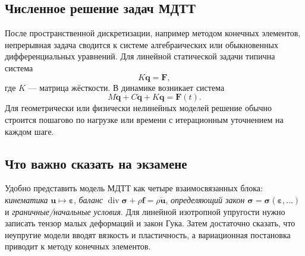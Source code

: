 \subsection{Численное решение задач МДТТ}

После пространственной дискретизации, например методом конечных элементов,
непрерывная задача сводится к системе алгебраических или обыкновенных
дифференциальных уравнений. Для линейной статической задачи типична система
\[
    K\mathbf q=\mathbf F,
\]
где $K$ --- матрица жёсткости. В динамике возникает система
\[
    M\ddot{\mathbf q}+C\dot{\mathbf q}+K\mathbf q=\mathbf F(t).
\]
Для геометрически или физически нелинейных моделей решение обычно строится
пошагово по нагрузке или времени с итерационным уточнением на каждом шаге.

\subsection{Что важно сказать на экзамене}

Удобно представить модель МДТТ как четыре взаимосвязанных блока:
\emph{кинематика} $\mathbf u\mapsto\boldsymbol\varepsilon$,
\emph{баланс} $\operatorname{div}\boldsymbol\sigma+\rho\mathbf f
=\rho\ddot{\mathbf u}$, \emph{определяющий закон}
$\boldsymbol\sigma=\boldsymbol\sigma(\boldsymbol\varepsilon,\ldots)$ и
\emph{граничные/начальные условия}. Для линейной изотропной упругости нужно
записать тензор малых деформаций и закон Гука. Затем достаточно сказать, что
неупругие модели вводят вязкость и пластичность, а вариационная постановка
приводит к методу конечных элементов.

\newpage
